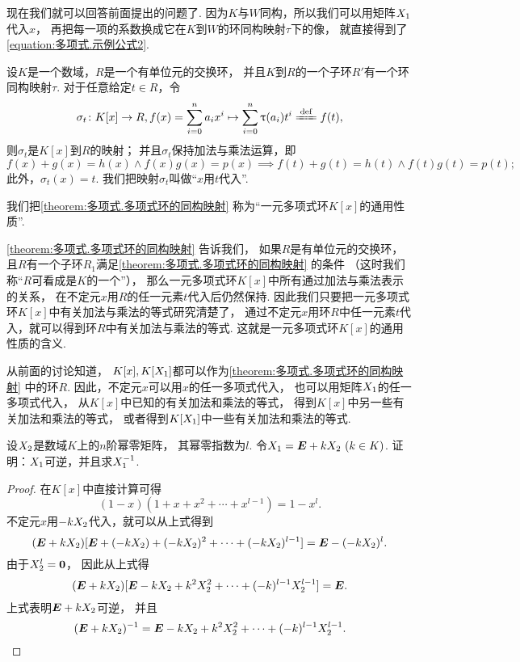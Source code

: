 现在我们就可以回答前面提出的问题了.
因为\(K\)与\(W\)同构，所以我们可以用矩阵\(X_1\)代入\(x\)，
再把每一项的系数换成它在\(K\)到\(W\)的环同构映射\(\tau\)下的像，
就直接得到了\cref{equation:多项式.示例公式2}.

\begin{theorem}\label{theorem:多项式.多项式环的同构映射}
设\(K\)是一个数域，\(R\)是一个有单位元的交换环，
并且\(K\)到\(R\)的一个子环\(R'\)有一个环同构映射\(\tau\).
对于任意给定\(t \in R\)，令\[
	\sigma_t\colon
	K[x] \to R,
	f(x)=\sum_{i=0}^n a_i x^i \mapsto \sum_{i=0}^n \tau(a_i) t^i \defeq f(t),
\]
则\(\sigma_t\)是\(K[x]\)到\(R\)的映射；
并且\(\sigma_t\)保持加法与乘法运算，即\[
	f(x)+g(x)=h(x) \land f(x) g(x) = p(x)
	\implies
	f(t)+g(t)=h(t) \land f(t) g(t) = p(t);
\]
此外，\(\sigma_t(x) = t\).
我们把映射\(\sigma_t\)叫做“\(x\)用\(t\)代入”.
\end{theorem}

我们把\cref{theorem:多项式.多项式环的同构映射}
称为“一元多项式环\(K[x]\)的通用性质”.

\cref{theorem:多项式.多项式环的同构映射} 告诉我们，
如果\(R\)是有单位元的交换环，
且\(R\)有一个子环\(R_1\)满足\cref{theorem:多项式.多项式环的同构映射} 的条件
（这时我们称“\(R\)可看成是\(K\)的一个”），
那么一元多项式环\(K[x]\)中所有通过加法与乘法表示的关系，
在不定元\(x\)用\(R\)的任一元素\(t\)代入后仍然保持.
因此我们只要把一元多项式环\(K[x]\)中有关加法与乘法的等式研究清楚了，
通过不定元\(x\)用环\(R\)中任一元素\(t\)代入，就可以得到环\(R\)中有关加法与乘法的等式.
这就是一元多项式环\(K[x]\)的通用性质的含义.

从前面的讨论知道，
\(K[x],K[X_1]\)都可以作为\cref{theorem:多项式.多项式环的同构映射} 中的环\(R\).
因此，不定元\(x\)可以用\(x\)的任一多项式代入，
也可以用矩阵\(X_1\)的任一多项式代入，
从\(K[x]\)中已知的有关加法和乘法的等式，
得到\(K[x]\)中另一些有关加法和乘法的等式，
或者得到\(K[X_1]\)中一些有关加法和乘法的等式.

\begin{example}
设\(X_2\)是数域\(K\)上的\(n\)阶幂零矩阵，
其幂零指数为\(l\).
令\(X_1=\boldsymbol{E}+kX_2\ (k \in K)\).
证明：\(X_1\)可逆，并且求\(X_1^{-1}\).
\begin{proof}
在\(K[x]\)中直接计算可得\[
	(1-x)(1+x+x^2+\dotsb+x^{l-1})
	=1-x^l.
\]
不定元\(x\)用\(-kX_2\)代入，就可以从上式得到\[
	(\boldsymbol{E}+kX_2)[\boldsymbol{E}+(-kX_2)+(-kX_2)^2+\dotsb+(-kX_2)^{l-1}]
	=\boldsymbol{E}-(-kX_2)^l.
\]
由于\(X_2^l=\boldsymbol0\)，
因此从上式得\[
	(\boldsymbol{E}+kX_2)[\boldsymbol{E}-kX_2+k^2X_2^2+\dotsb+(-k)^{l-1}X_2^{l-1}]
	=\boldsymbol{E}.
\]
上式表明\(\boldsymbol{E}+kX_2\)可逆，
并且\[
	(\boldsymbol{E}+kX_2)^{-1}
	= \boldsymbol{E}-kX_2+k^2X_2^2+\dotsb+(-k)^{l-1}X_2^{l-1}.
	\qedhere
\]
\end{proof}
\end{example}